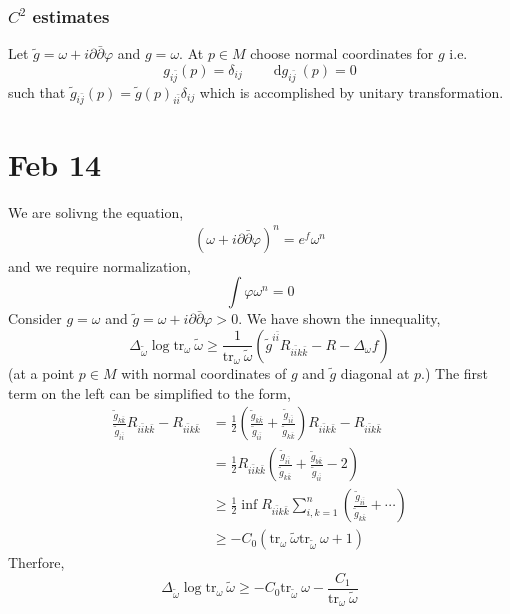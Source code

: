 \documentclass[12pt]{extarticle}
\renewcommand{\d}[1]{\: \mathrm{d}#1 \:}
\theoremstyle{definition}
\begin{document}
\subsubsection{$C^2$ estimates}

Let $\tilde{g} = \omega + i \partial \bar{\partial} \varphi$ and $g = \omega$. At $p \in M$ choose normal coordinates for $g$ i.e.
\[ g_{i \bar{j}}(p) = \delta_{ij} \quad \quad \d{g_{i \bar{j}}}(p) = 0 \]
such that $\tilde{g}_{i \bar{j}}(p) = \tilde{g}(p)_{i \bar{i}} \delta_{ij}$ which is accomplished by unitary transformation. 


\section{Feb 14}
\newcommand{\tr}[1]{\mathrm{tr}_{#1} \:}
We are solivng the equation,
\begin{align*}
(\omega + i \partial \bar{\partial} \varphi)^n = e^f \omega^n 
\end{align*}
and we require normalization,
\[ \int \varphi \omega^n = 0 \]
Consider $g = \omega$ and $\tilde{g} = \omega + i \partial \bar{\partial} \varphi > 0$. We have shown the innequality,
\[ \Delta_{\tilde{\omega}} \log{\tr{\omega} \tilde{\omega}} \ge \frac{1}{\tr{\omega}\tilde{\omega}} \left( \tilde{g}^{i \bar{i}} R_{i\bar{i}k\bar{k}} - R - \Delta_\omega f \right) \]
(at a point $p \in M$ with normal coordinates of $g$ and $\tilde{g}$ diagonal at $p$.)
The first term on the left can be simplified to the form,
\begin{align*}
\frac{\tilde{g}_{k \bar{k}}}{\tilde{g}_{i \bar{i}}} R_{i \bar{i} k \bar{k}} - R_{i \bar{i} k \bar{k}} 
& = \frac{1}{2} \left( \frac{\tilde{g}_{k \bar{k}}}{\tilde{g}_{i\bar{i}}} + \frac{\tilde{g}_{i \bar{i}}}{\tilde{g}_{k \bar{k}}}  \right) R_{i \bar{i} k \bar{k}} - R_{i \bar{i} k \bar{k}} 
\\
& = \tfrac{1}{2} R_{i \bar{i} k \bar{k}} \left( \frac{\tilde{g}_{i \bar{i}}}{\tilde{g}_{k \bar{k}}} + \frac{\tilde{g}_{b \bar{k}}}{\tilde{g}_{i \bar{i}}} - 2 \right) 
\\
& \ge \tfrac{1}{2} \inf R_{i \bar{i} k \bar{k}} \sum_{i,k = 1}^n \left( \frac{\tilde{g}_{i \bar{i}}}{\tilde{g}_{k \bar{k}}} + \cdots \right)
\\
& \ge - C_0 \left( \tr{\omega} \tilde{\omega} \tr{\tilde{\omega}} \omega + 1 \right) 
\end{align*}
Therfore,
\[ \Delta_{\tilde{\omega}} \log{\tr{\omega} \tilde{\omega}} \ge - C_0 \tr{\tilde{\omega}} \omega - \frac{C_1}{\tr{\omega} \tilde{\omega}} \]
\end{document}
